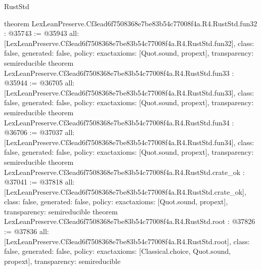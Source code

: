 \begin{lexlean}{RustStd}
\begin{coremodule}
{}
theorem LexLeanPreserve.Cf3ead6f7508368e7be83b54c77008f4a.R4.RustStd.fun32 : @35743 := @35943 {
  all: [LexLeanPreserve.Cf3ead6f7508368e7be83b54c77008f4a.R4.RustStd.fun32],
  class: false,
  generated: false,
  policy: exact{axioms: [Quot.sound, propext]},
  transparency: semireducible
}
theorem LexLeanPreserve.Cf3ead6f7508368e7be83b54c77008f4a.R4.RustStd.fun33 : @35944 := @36705 {
  all: [LexLeanPreserve.Cf3ead6f7508368e7be83b54c77008f4a.R4.RustStd.fun33],
  class: false,
  generated: false,
  policy: exact{axioms: [Quot.sound, propext]},
  transparency: semireducible
}
theorem LexLeanPreserve.Cf3ead6f7508368e7be83b54c77008f4a.R4.RustStd.fun34 : @36706 := @37037 {
  all: [LexLeanPreserve.Cf3ead6f7508368e7be83b54c77008f4a.R4.RustStd.fun34],
  class: false,
  generated: false,
  policy: exact{axioms: [Quot.sound, propext]},
  transparency: semireducible
}
theorem LexLeanPreserve.Cf3ead6f7508368e7be83b54c77008f4a.R4.RustStd.crate_ok : @37041 := @37818 {
  all: [LexLeanPreserve.Cf3ead6f7508368e7be83b54c77008f4a.R4.RustStd.crate_ok],
  class: false,
  generated: false,
  policy: exact{axioms: [Quot.sound, propext]},
  transparency: semireducible
}
theorem LexLeanPreserve.Cf3ead6f7508368e7be83b54c77008f4a.R4.RustStd.root : @37826 := @37836 {
  all: [LexLeanPreserve.Cf3ead6f7508368e7be83b54c77008f4a.R4.RustStd.root],
  class: false,
  generated: false,
  policy: exact{axioms: [Classical.choice, Quot.sound, propext]},
  transparency: semireducible
}


\end{coremodule}
\end{lexlean}
